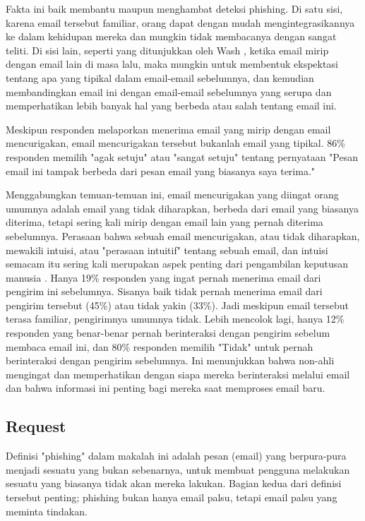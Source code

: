 \documentclass[lettersize,journal]{IEEEtran}
\begin{document}
Fakta ini baik membantu maupun menghambat deteksi phishing. Di satu sisi,
karena email tersebut familiar, orang dapat dengan mudah mengintegrasikannya ke
dalam kehidupan mereka dan mungkin tidak membacanya dengan sangat teliti. Di
sisi lain, seperti yang ditunjukkan oleh Wash \cite{tigaempat}, ketika email
mirip dengan email lain di masa lalu, maka mungkin untuk membentuk ekspektasi
tentang apa yang tipikal dalam email-email sebelumnya, dan kemudian
membandingkan email ini dengan email-email sebelumnya yang serupa dan
memperhatikan lebih banyak hal yang berbeda atau salah tentang email ini.

Meskipun responden melaporkan menerima email yang mirip dengan email
mencurigakan, email mencurigakan tersebut bukanlah email yang tipikal. 86\%
responden memilih "agak setuju" atau "sangat setuju" tentang pernyataan "Pesan
email ini tampak berbeda dari pesan email yang biasanya saya terima."

Menggabungkan temuan-temuan ini, email mencurigakan yang diingat orang umumnya
adalah email yang tidak diharapkan, berbeda dari email yang biasanya diterima,
tetapi sering kali mirip dengan email lain yang pernah diterima sebelumnya.
Perasaan bahwa sebuah email mencurigakan, atau tidak diharapkan, mewakili
intuisi, atau "perasaan intuitif" tentang sebuah email, dan intuisi semacam itu
sering kali merupakan aspek penting dari pengambilan keputusan manusia
\cite{satudelapan}. Hanya 19\% responden yang ingat pernah menerima email dari
pengirim ini sebelumnya. Sisanya baik tidak pernah menerima email dari pengirim
tersebut (45\%) atau tidak yakin (33\%). Jadi meskipun email tersebut terasa
familiar, pengirimnya umumnya tidak. Lebih mencolok lagi, hanya 12\% responden
yang benar-benar pernah berinteraksi dengan pengirim sebelum membaca email ini,
dan 80\% responden memilih "Tidak" untuk pernah berinteraksi dengan pengirim
sebelumnya. Ini menunjukkan bahwa non-ahli mengingat dan memperhatikan dengan
siapa mereka berinteraksi melalui email dan bahwa informasi ini penting bagi
mereka saat memproses email baru.

\subsection{Request}

Definisi "phishing" dalam makalah ini adalah pesan (email) yang berpura-pura
menjadi sesuatu yang bukan sebenarnya, untuk membuat pengguna melakukan sesuatu
yang biasanya tidak akan mereka lakukan. Bagian kedua dari definisi tersebut
penting; phishing bukan hanya email palsu, tetapi email palsu yang meminta
tindakan.
\end{document}
